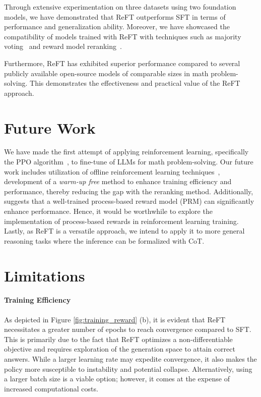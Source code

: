 Through extensive experimentation on three datasets using two foundation models, we have demonstrated that ReFT outperforms SFT in terms of performance and generalization ability. Moreover, we have showcased the compatibility of models trained with ReFT with techniques such as majority voting~\cite{wang2022self} and reward model reranking~\cite{cobbe2021training,uesato2022solving}.

Furthermore, ReFT has exhibited superior performance compared to several publicly available open-source models of comparable sizes in math problem-solving. This demonstrates the effectiveness and practical value of the ReFT approach.

\section{Future Work}
We have made the first attempt of applying reinforcement learning, specifically the PPO algorithm~\cite{schulman2017proximal}, to fine-tune of LLMs for math problem-solving. Our future work includes utilization of offline reinforcement learning techniques~\cite{levine2020offline,gulcehre2023reinforced}, development of a \textit{warm-up free} method to enhance training efficiency and performance, thereby reducing the gap with the reranking method. Additionally, \citet{lightman2023lets} suggests that a well-trained process-based reward model (PRM) can significantly enhance performance. Hence, it would be worthwhile to explore the implementation of process-based rewards in reinforcement learning training. 
Lastly, as ReFT is a versatile approach, we intend to apply it to more general reasoning tasks where the inference can be formalized with CoT.

\section*{Limitations}
\paragraph{Training Efficiency}
As depicted in Figure \ref{fig:training_reward} (b), it is evident that ReFT necessitates a greater number of epochs to reach convergence compared to SFT. This is primarily due to the fact that ReFT optimizes a non-differentiable objective and requires exploration of the generation space to attain correct answers. While a larger learning rate may expedite convergence, it also makes the policy more susceptible to instability and potential collapse. Alternatively, using a larger batch size is a viable option; however, it comes at the expense of increased computational costs.

